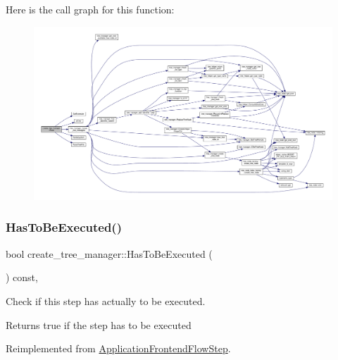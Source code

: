 Here is the call graph for this function\+:
\nopagebreak
\begin{figure}[H]
\begin{center}
\leavevmode
\includegraphics[width=350pt]{d6/d8a/classcreate__tree__manager_a1703cbe6a6f2df1ca3ef7809e8682fac_cgraph}
\end{center}
\end{figure}
\mbox{\label{classcreate__tree__manager_ab0dc851ab662326a6d0a5ecfeba7d663}} 
\subsubsection{\texorpdfstring{Has\+To\+Be\+Executed()}{HasToBeExecuted()}}
{\footnotesize\ttfamily bool create\+\_\+tree\+\_\+manager\+::\+Has\+To\+Be\+Executed (\begin{DoxyParamCaption}{ }\end{DoxyParamCaption}) const\hspace{0.3cm}{\ttfamily [override]}, {\ttfamily [virtual]}}



Check if this step has actually to be executed. 

\begin{DoxyReturn}{Returns}
true if the step has to be executed 
\end{DoxyReturn}


Reimplemented from \hyperlink{classApplicationFrontendFlowStep_ad99f4dcbab470c65eea79ae0291a4bd5}{Application\+Frontend\+Flow\+Step}.



